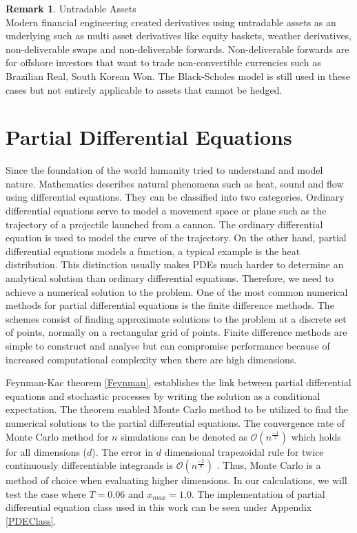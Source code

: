 \documentclass[12pt, oneside]{book}
\theoremstyle{plain}
\theoremstyle{definition}
\newtheorem{remark}[theorem]{Remark}
\begin{document}
\begin{remark}Untradable Assets\\ Modern financial engineering created derivatives using untradable assets as an underlying such as multi asset derivatives like equity baskets, weather derivatives, non-deliverable swaps and non-deliverable forwards. Non-deliverable forwards are for offshore investors that want to trade non-convertible currencies such as Brazilian Real, South Korean Won.  The Black-Scholes model is still used in these cases \cite{weather} \cite{basket} but not entirely applicable to assets that cannot be hedged.
\end{remark}


\section{Partial Differential Equations}
Since the foundation of the world humanity tried to understand and model nature. Mathematics describes natural phenomena such as heat, sound and flow using differential equations. They can be classified into two categories. Ordinary differential equations serve to model a movement space or plane such as the trajectory of a projectile launched from a cannon. The ordinary differential equation is used to model the curve of the trajectory. On the other hand, partial differential equations models a function, a typical example is the heat distribution. This distinction usually makes PDEs much harder to determine an analytical solution than ordinary differential equations.  Therefore, we need to achieve a numerical solution to the problem. One of the most common numerical methods for partial differential equations is the finite difference methods. The schemes consist of finding approximate solutions to the problem at a discrete set of points, normally on a rectangular grid of points. Finite difference methods are simple to construct and analyse but can compromise performance because of increased computational complexity when there are high dimensions. 

Feynman-Kac theorem \ref{Feynman}, establishes the link between partial differential equations and stochastic processes by writing the solution as a conditional expectation. The theorem enabled Monte Carlo method to be utilized to find the numerical solutions to the partial differential equations. The convergence rate of Monte Carlo method for $n$ simulations can be denoted as $\mathcal{O}(n^{\frac{-1}{2}}) $ which holds for all dimensions ($d$). The error in $d$ dimensional trapezoidal rule for twice continuously differentiable integrands is $\mathcal{O}(n^{\frac{-2}{d}}) $ \cite{glasserman}. Thus, Monte Carlo is a method of choice when evaluating higher dimensions. In our calculations, we will test the case where $T = 0.06$ and $x_{max} = 1.0$. The implementation of partial differential equation class used in this work can be seen under Appendix \ref{PDEClass}.
 
\end{document}
